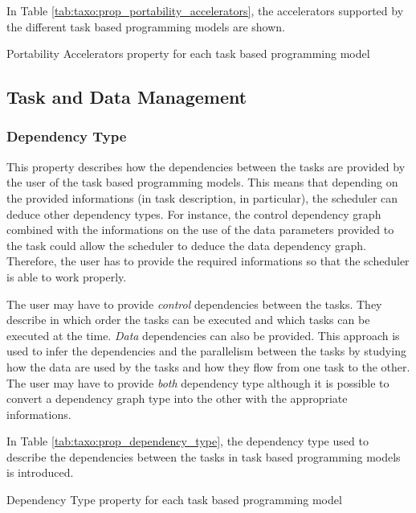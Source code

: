 In Table \ref{tab:taxo:prop_portability_accelerators}, the accelerators supported by the different task based programming models are shown.
\begin{table}[H]
	\caption{Portability Accelerators property for each task based programming model \label{tab:taxo:prop_portability_accelerators}}
	\centering
	\begin{multicols}{2}
		

		
	\end{multicols}
\end{table}

\subsection{Task and Data Management}
\subsubsection{Dependency Type}
This property describes how the dependencies between the tasks are provided by the user of the task based programming models.
This means that depending on the provided informations (in task description, in particular), the scheduler can deduce other dependency types.
For instance, the control dependency graph combined with the informations on the use of the data parameters provided to the task could allow the scheduler to deduce the data dependency graph.
Therefore, the user has to provide the required informations so that the scheduler is able to work properly.

The user may have to provide \textit{control} dependencies between the tasks.
They describe in which order the tasks can be executed and which tasks can be executed at the time.
\textit{Data} dependencies can also be provided.
This approach is used to infer the dependencies and the parallelism between the tasks by studying how the data are used by the tasks and how they flow from one task to the other.
The user may have to provide \textit{both} dependency type although it is possible to convert a dependency graph type into the other with the appropriate informations.

In Table \ref{tab:taxo:prop_dependency_type}, the dependency type used to describe the dependencies between the tasks in task based programming models is introduced.
\begin{table}[H]
	\caption{Dependency Type property for each task based programming model \label{tab:taxo:prop_dependency_type}}
	\centering
	\begin{multicols}{2}
		

		
	\end{multicols}
\end{table}

